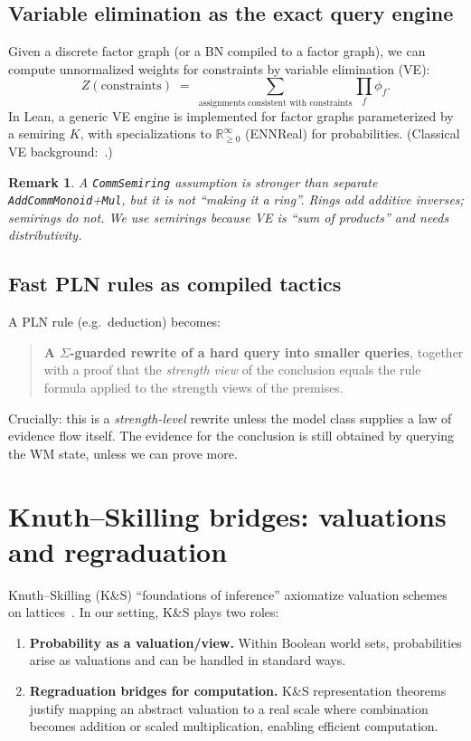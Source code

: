 \documentclass[11pt]{article}
\newtheorem{remark}{Remark}
\begin{document}
\subsection{Variable elimination as the exact query engine}

Given a discrete factor graph (or a BN compiled to a factor graph), we can compute
unnormalized weights for constraints by variable elimination (VE):
\[
  Z(\text{constraints}) \;=\; \sum_{\text{assignments consistent with constraints}} \prod_f \phi_f.
\]
In Lean, a generic VE engine is implemented for factor graphs parameterized by a semiring $K$,
with specializations to $\mathbb{R}_{\ge 0}^\infty$ (ENNReal) for probabilities.
(Classical VE background:~\cite{Dechter}.)

\begin{remark}
A \texttt{CommSemiring} assumption is \emph{stronger} than separate \texttt{AddCommMonoid}+\texttt{Mul},
but it is not ``making it a ring''. Rings add additive inverses; semirings do not.
We use semirings because VE is ``sum of products'' and needs distributivity.
\end{remark}

\subsection{Fast PLN rules as compiled tactics}

A PLN rule (e.g.\ deduction) becomes:

\begin{quote}
\textbf{A $\Sigma$-guarded rewrite of a hard query into smaller queries}, together with a proof
that the \emph{strength view} of the conclusion equals the rule formula applied to
the strength views of the premises.
\end{quote}

Crucially: this is a \emph{strength-level} rewrite unless the model class supplies a law of
evidence flow itself. The evidence for the conclusion is still obtained by querying the WM state,
unless we can prove more.

\section{Knuth--Skilling bridges: valuations and regraduation}

Knuth--Skilling (K\&S) ``foundations of inference'' axiomatize valuation schemes on lattices~\cite{KnuthSkilling}.
In our setting, K\&S plays two roles:

\begin{enumerate}[leftmargin=2em]
\item \textbf{Probability as a valuation/view.}
Within Boolean world sets, probabilities arise as valuations and can be handled in standard ways.
\item \textbf{Regraduation bridges for computation.}
K\&S representation theorems justify mapping an abstract valuation to a real scale where
combination becomes addition or scaled multiplication, enabling efficient computation.
\end{enumerate}
\end{document}

